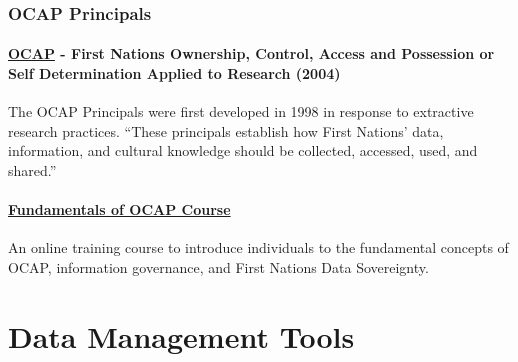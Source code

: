 \documentclass[
]{book}
\begin{document}
\hypertarget{ocap-principals}{%
\subsection{OCAP Principals}\label{ocap-principals}}

\hypertarget{ocap---first-nations-ownership-control-access-and-possession-or-self-determination-applied-to-research-2004}{%
\subsubsection*{\texorpdfstring{\href{https://biblio.uottawa.ca/sites/biblio.uottawa.ca/files/bestpractices_fnigc_ocap_fact_sheet_en_final.pdf}{OCAP} - First Nations Ownership, Control, Access and Possession or Self Determination Applied to Research (2004)}{OCAP - First Nations Ownership, Control, Access and Possession or Self Determination Applied to Research (2004)}}\label{ocap---first-nations-ownership-control-access-and-possession-or-self-determination-applied-to-research-2004}}

The OCAP Principals were first developed in 1998 in response to extractive research practices. ``These principals establish how First Nations' data, information, and cultural knowledge should be collected, accessed, used, and shared.''

\hypertarget{fundamentals-of-ocap-course}{%
\subsubsection*{\texorpdfstring{\href{https://fnigc.ca/ocap-training/take-the-course/}{Fundamentals of OCAP Course}}{Fundamentals of OCAP Course}}\label{fundamentals-of-ocap-course}}

An online training course to introduce individuals to the fundamental concepts of OCAP, information governance, and First Nations Data Sovereignty.

\hypertarget{data-management-tools}{%
\chapter{Data Management Tools}\label{data-management-tools}}
\end{document}
